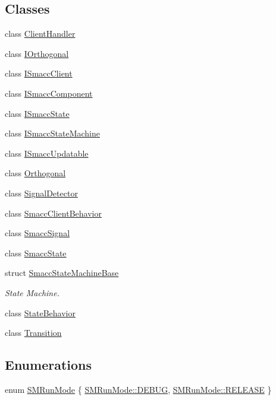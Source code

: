 \subsection*{Classes}
\begin{DoxyCompactItemize}
\item 
class \hyperlink{classsmacc_1_1ClientHandler}{Client\+Handler}
\item 
class \hyperlink{classsmacc_1_1IOrthogonal}{I\+Orthogonal}
\item 
class \hyperlink{classsmacc_1_1ISmaccClient}{I\+Smacc\+Client}
\item 
class \hyperlink{classsmacc_1_1ISmaccComponent}{I\+Smacc\+Component}
\item 
class \hyperlink{classsmacc_1_1ISmaccState}{I\+Smacc\+State}
\item 
class \hyperlink{classsmacc_1_1ISmaccStateMachine}{I\+Smacc\+State\+Machine}
\item 
class \hyperlink{classsmacc_1_1ISmaccUpdatable}{I\+Smacc\+Updatable}
\item 
class \hyperlink{classsmacc_1_1Orthogonal}{Orthogonal}
\item 
class \hyperlink{classsmacc_1_1SignalDetector}{Signal\+Detector}
\item 
class \hyperlink{classsmacc_1_1SmaccClientBehavior}{Smacc\+Client\+Behavior}
\item 
class \hyperlink{classsmacc_1_1SmaccSignal}{Smacc\+Signal}
\item 
class \hyperlink{classsmacc_1_1SmaccState}{Smacc\+State}
\item 
struct \hyperlink{structsmacc_1_1SmaccStateMachineBase}{Smacc\+State\+Machine\+Base}
\begin{DoxyCompactList}\small\item\em State Machine. \end{DoxyCompactList}\item 
class \hyperlink{classsmacc_1_1StateBehavior}{State\+Behavior}
\item 
class \hyperlink{classsmacc_1_1Transition}{Transition}
\end{DoxyCompactItemize}
\subsection*{Enumerations}
\begin{DoxyCompactItemize}
\item 
enum \hyperlink{namespacesmacc_a3e4f79486ea6ea6342dd3c712d16a4f6}{S\+M\+Run\+Mode} \{ \hyperlink{namespacesmacc_a3e4f79486ea6ea6342dd3c712d16a4f6adc30ec20708ef7b0f641ef78b7880a15}{S\+M\+Run\+Mode\+::\+D\+E\+B\+UG}, 
\hyperlink{namespacesmacc_a3e4f79486ea6ea6342dd3c712d16a4f6a7d649ef069df9885e382417c79f3d5cd}{S\+M\+Run\+Mode\+::\+R\+E\+L\+E\+A\+SE}
 \}
\end{DoxyCompactItemize}
